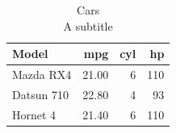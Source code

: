 \begin{table}[t]
\caption*{
{\fontsize{20}{25}\selectfont  Cars\fontsize{12}{15}\selectfont } \\ 
{\fontsize{14}{17}\selectfont  A subtitle\fontsize{12}{15}\selectfont }
} 
\fontsize{12.0pt}{14.0pt}\selectfont
\begin{tabular*}{\linewidth}{@{\extracolsep{\fill}}lrrr}
\toprule
Model & mpg & cyl & hp \\ 
\midrule\addlinespace[2.5pt]
Mazda RX4 & 21.00 & 6 & 110 \\ 
Datsun 710 & 22.80 & 4 & 93 \\ 
Hornet 4 & 21.40 & 6 & 110 \\ 
\bottomrule
\end{tabular*}
\end{table}

